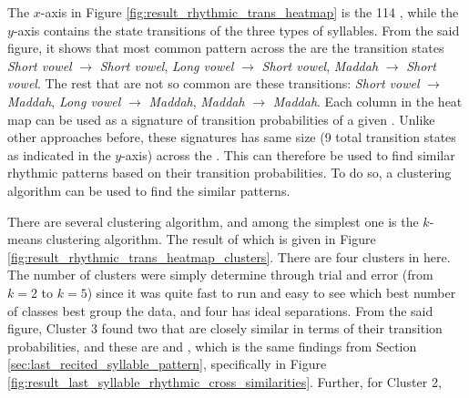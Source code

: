 The $x$-axis in Figure \ref{fig:result_rhythmic_trans_heatmap} is the 114  , while the $y$-axis contains the state transitions of the three types of syllables. From the said figure, it shows that most common pattern across the   are the transition states \textit{Short vowel} $\rightarrow$ \textit{Short vowel}, \textit{Long vowel} $\rightarrow$ \textit{Short vowel}, \textit{Maddah} $\rightarrow$ \textit{Short vowel}. The rest that are not so common are these transitions: \textit{Short vowel} $\rightarrow$ \textit{Maddah}, \textit{Long vowel} $\rightarrow$ \textit{Maddah}, \textit{Maddah} $\rightarrow$ \textit{Maddah}. Each column in the heat map can be used as a signature of transition probabilities of a given  . Unlike other approaches before, these signatures has same size (9 total transition states as indicated in the $y$-axis) across the  . This can therefore be used to find similar rhythmic patterns based on their transition probabilities. To do so, a clustering algorithm can be used to find the similar patterns.

There are several clustering algorithm, and among the simplest one is the $k$-means clustering algorithm. The result of which is given in Figure \ref{fig:result_rhythmic_trans_heatmap_clusters}. There are four clusters in here. The number of clusters were simply determine through trial and error (from $k=2$ to $k=5$) since it was quite fast to run and easy to see which best number of classes best group the data, and four has ideal separations. From the said figure, Cluster 3 found two   that are closely similar in terms of their transition probabilities, and these are  
and  , which is the same findings from Section \ref{sec:last_recited_syllable_pattern}, specifically in Figure \ref{fig:result_last_syllable_rhythmic_cross_similarities}. Further, for Cluster 2,    

